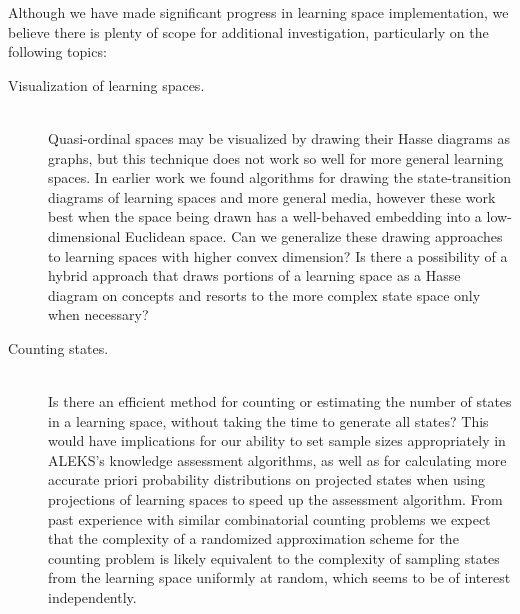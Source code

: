 \documentclass[11pt]{llncs}
\begin{document}
{Although we have made significant progress in learning space implementation, we believe there is plenty of scope for additional investigation, particularly on the following topics:

\begin{description}
\item[Visualization of learning spaces.] \hfill\\
Quasi-ordinal spaces may be visualized by drawing their Hasse diagrams as graphs, but this technique does not work so well for more general learning spaces.
In earlier work \citep{eppst04,eppst06} we found algorithms for drawing the state-transition diagrams of learning spaces and more general media, however these work best when the space being drawn has a well-behaved embedding into a low-dimensional Euclidean space. Can we generalize these drawing approaches to learning spaces with higher convex dimension? Is there a possibility of a hybrid approach that  draws portions of a learning space as a Hasse diagram on concepts and resorts to the more complex state space only when necessary?

\item[Counting states.] \hfill\\
Is there an efficient method for counting or estimating the number of states in a learning space, without taking the time to generate all states? This would have implications for our ability to set sample sizes appropriately in ALEKS's knowledge assessment algorithms, as well as for calculating more accurate priori probability distributions on projected states when using projections of learning spaces to speed up the assessment algorithm. From past experience with similar combinatorial counting problems \citep[e.g.,][]{JerSinVig-STOC-01} we expect that the complexity of a randomized approximation scheme for the counting problem is likely equivalent to the complexity of sampling states from the learning space uniformly at random, which seems to be of interest independently.


\end{description}}
\end{document}
